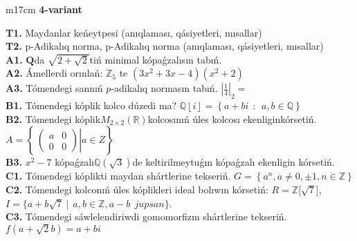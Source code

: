 \documentclass{article}
\begin{document}
\begin{tabular}{m{17cm}}
\textbf{4-variant}
\newline

\textbf{T1.} Maydanlar keńeytpesi (anıqlaması, qásiyetleri, mısallar) \\
\textbf{T2.} p-Adikalıq norma, p-Adikalıq norma (anıqlaması, qásiyetleri, mısallar) \\
\textbf{A1.} \(\mathbf{Q}\)da \(\sqrt{2 + \sqrt{2}}\)tiń minimal kópaǵzalısın tabıń. \\
\textbf{A2.} Ámellerdi orınlań: \(\mathbb{Z}_{5}\) te \(\left( 3x^{2} + 3x - 4 \right)\left( x^{2} + 2 \right)\) \\
\textbf{A3.} Tómendegi sannıń \(p\)-adikalıq normasın tabıń. \(|\frac{1}{4}|_{2} =\) \\
\textbf{B1.} Tómendegi kóplik kolco dúzedi ma? \(\mathbb{Q}\left\lfloor i \right\rfloor = \left\{ a + bi\ \ :\ \ a,b\mathbb{\in Q} \right\}\) \\
\textbf{B2.} Tómendegi kóplik\(M_{2 \times 2}\left( \mathbb{R} \right)\)kolcosınıń úles kolcosı ekenliginkórsetiń. \(A = \left\{ \left. \ \begin{pmatrix}
a & 0 \\
0 & 0
\end{pmatrix} \right|a \in Z \right\}\) \\
\textbf{B3.} \(x^{2} - 7\) kópaǵzalı\(\mathbb{Q}(\sqrt{3})\)de keltirilmeytuǵın kópaǵzalı ekenligin kórsetiń. \\
\textbf{C1.} Tómendegi kóplikti maydan shártlerine tekseriń. \(G = \left\{ a^{n},a \neq 0, \pm 1,n \in \mathbb{Z} \right\}\) \\
\textbf{C2.} Tómendegi kolconıń úles kóplikleri ideal bolıwın kórsetiń:
\(R\mathbb{= Z\lbrack}\sqrt{7}\rbrack\), \(I = \{ a + b\sqrt{7}\ |\ \ a,b \in \mathbb{Z,}a - b\ \ jupsan\}\). \\
\textbf{C3.} Tómendegi sáwlelendiriwdi gomomorfizm shártlerine tekseriń. \(f\left( a + \sqrt{2}b \right) = a + bi\) \\

\end{tabular}
\vspace{1cm}
\end{document}
